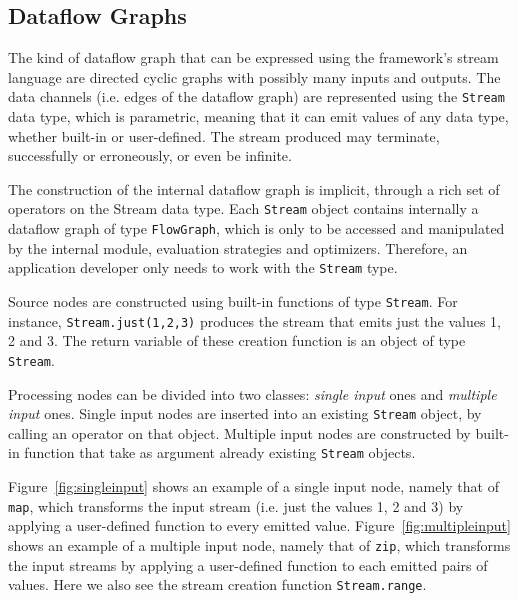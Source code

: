 \documentclass[sigplan,screen]{acmart}
\begin{document}
\subsection{Dataflow Graphs}

The kind of dataflow graph that can be expressed using the framework's stream
language are directed cyclic graphs with possibly many inputs and outputs.
%
The data channels (i.e. edges of the dataflow graph) are represented using the
\texttt{Stream} data type, which is parametric, meaning that it can emit values
of any data type, whether built-in or user-defined. The stream produced may
terminate, successfully or erroneously, or even be infinite.

The construction of the internal dataflow graph is implicit, through a
rich set of operators on the Stream data type. Each \texttt{Stream} object
contains internally a dataflow graph of type \texttt{FlowGraph}, which is only
to be accessed and manipulated by the internal module, evaluation strategies and
optimizers. Therefore, an application developer only needs to work with the
\texttt{Stream} type.

Source nodes are constructed using built-in functions of type \texttt{Stream}.
For instance, \texttt{Stream.just(1,2,3)} produces the stream that emits just
the values 1, 2 and 3. The return variable of these creation function is an
object of type \texttt{Stream}.

Processing nodes can be divided into two classes: \textit{single input} ones and
\textit{multiple input} ones.
%
Single input nodes are inserted into an existing \texttt{Stream} object, by
calling an operator on that object.
Multiple input nodes are constructed by built-in function that take as
argument already existing \texttt{Stream} objects.

%
%
Figure~\ref{fig:singleinput} shows an
example of a single input node, namely that of \texttt{map}, which transforms
the input stream (i.e. just the values 1, 2 and 3) by applying a user-defined
function to every emitted value.
%
Figure~\ref{fig:multipleinput} shows
an example of a multiple input node, namely that of \texttt{zip}, which
transforms the input streams by
applying a user-defined function to each emitted pairs of values.
Here we also see the stream creation function \texttt{Stream.range}.
%
\end{document}
